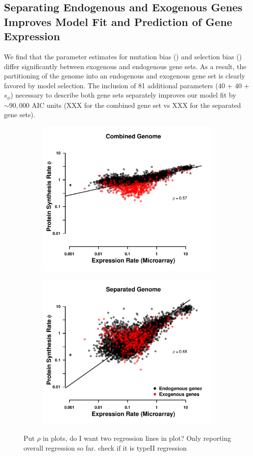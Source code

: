 \documentclass[12pt]{article}
\begin{document}
\subsection*{Separating Endogenous and Exogenous Genes Improves Model Fit and Prediction of Gene Expression}

We find that the parameter estimates for mutation bias (\DM) and selection bias (\DE) differ significantly between exogenous and endogenous gene sets.
As a result, the partitioning of the \kluyveri genome into an endogenous and exogenous gene set is clearly favored by model selection.
The inclusion of 81 additional parameters ($40$ \DM + $40$ \DE + $s_{\phi}$) necessary to describe both gene sets separately improves our model fit by $\sim 90,000$ AIC units (XXX for the combined gene set vs XXX for the separated gene sets).

\begin{figure}[t]
    \centering
    \begin{subfigure}
        \centering
        \includegraphics[width=.45\textwidth]{img/phi_corr_plot_whole_Genome_estim.pdf}
    \end{subfigure}
    \begin{subfigure}
        \centering
        \includegraphics[width=.45\textwidth]{img/phi_corr_plot_split_Genome_estim.pdf}
    \end{subfigure}
    \caption{Put $\rho$ in plots, do I want two regression lines in plot? Only reporting overall regression so far. check if it is typeII regression}
    \label{fig:phi_corr_two_cond}
\end{figure}
\end{document}
